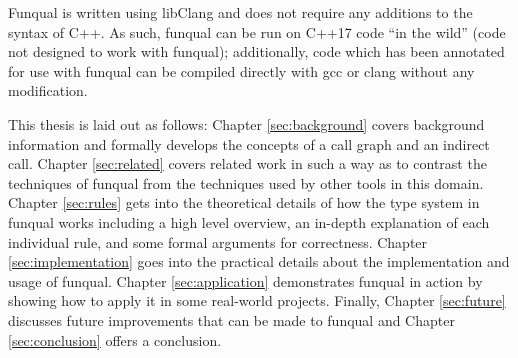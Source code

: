 Funqual is written using libClang and does not require any additions to the syntax of C++.  As such, funqual can be run on C++17 code ``in the wild'' (code not designed to work with funqual);  additionally, code which has been annotated for use with funqual can be compiled directly with gcc or clang without any modification.  

This thesis is laid out as follows:  Chapter \ref{sec:background} covers background information and formally develops the concepts of a call graph and an indirect call.  Chapter \ref{sec:related} covers related work in such a way as to contrast the techniques of funqual from the techniques used by other tools in this domain.  Chapter \ref{sec:rules} gets into the theoretical details of how the type system in funqual works including a high level overview, an in-depth explanation of each individual rule, and some formal arguments for correctness.  Chapter \ref{sec:implementation} goes into the practical details about the implementation and usage of funqual.  Chapter \ref{sec:application} demonstrates funqual in action by showing how to apply it in some real-world projects.  Finally, Chapter \ref{sec:future} discusses future improvements that can be made to funqual and Chapter \ref{sec:conclusion} offers a conclusion.





